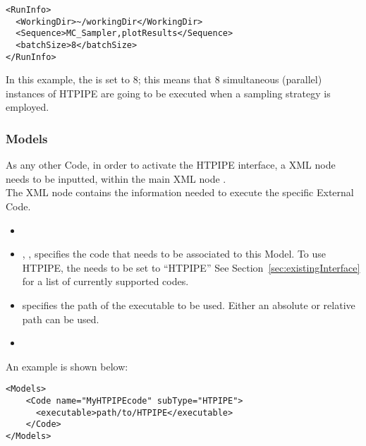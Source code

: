 \begin{lstlisting}[style=XML]
<RunInfo>
  <WorkingDir>~/workingDir</WorkingDir>
  <Sequence>MC_Sampler,plotResults</Sequence>
  <batchSize>8</batchSize>
</RunInfo>
\end{lstlisting}
In this example, the  is set to $8$; this means that 8 simultaneous (parallel) instances
of HTPIPE are going to be executed when a sampling strategy is employed.

\subsubsection{Models}
As any other Code, in order to activate the HTPIPE interface, a  XML node needs to be inputted, within the
main XML node .
\\The  {} XML node contains the
information needed to execute the specific External Code.

\attrsIntro
%

\begin{itemize}
  \itemsep0em
  \item \nameDescription
  \item {}, , specifies the
  code that needs to be associated to this Model. To use HTPIPE, the  needs to be set to ``HTPIPE'' 
  \nb See Section~\ref{sec:existingInterface} for a list of currently supported
  codes.
\end{itemize}


\subnodesIntro
%
\begin{itemize}
  \item {}  specifies the path
  of the executable to be used.
  \nb Either an absolute or relative path can be used.
  \item {}
\end{itemize}

An example  is shown  below:

\begin{lstlisting}[style=XML]
<Models>
    <Code name="MyHTPIPEcode" subType="HTPIPE">
      <executable>path/to/HTPIPE</executable>
    </Code>
</Models>
\end{lstlisting}

